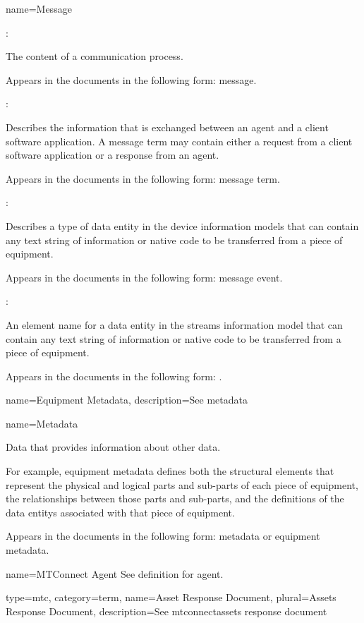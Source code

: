 {
  name={Message}
}
{
	:

	The content of a communication process.

	Appears in the documents in the following form: message.

	:

	Describes the information that is exchanged between an \gls{agent} and a client software application.  A \gls{message term} may contain either a \gls{request} from a client software application or a \gls{response} from an \gls{agent}.

	Appears in the documents in the following form: \gls{message term}.

	:

	Describes a type of \gls{data entity} in the \glspl{device information model} that can contain any text string of information or native code to be transferred from a piece of equipment.

	Appears in the documents in the following form: \gls{message event}.

	:

	An \gls{element name} for a \gls{data entity} in the \gls{streams information model} that can contain any text string of information or native code to be transferred from a piece of equipment.

	Appears in the documents in the following form:  .
}


{
  name={Equipment Metadata},
  description={See \gls{metadata}}
}


{
  name={Metadata}
}
{
	Data that provides information about other data.

	For example, \gls{equipment metadata} defines both the \glspl{structural element} that represent the physical and logical parts and sub-parts of each piece of equipment, the relationships between those parts and sub-parts, and the definitions of the \glspl{data entity} associated with that piece of equipment.

	Appears in the documents in the following form: \gls{metadata} or \gls{equipment metadata}.
}


{
  name={MTConnect Agent}
}
{
	See definition for \gls{agent}.
}


{
  type=mtc,
  category=term,
  name={Asset Response Document},
  plural={Assets Response Document},
  description={See \gls{mtconnectassets response document}}
}

